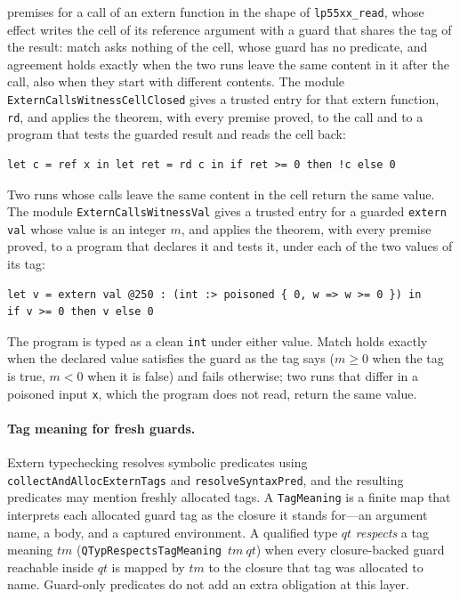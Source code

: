 \documentclass[12pt]{article}
\begin{document}
premises for a call of an extern function in the shape of
\texttt{lp55xx\_read}, whose effect writes the cell of its reference argument
with a guard that shares the tag of the result: match asks nothing of the
cell, whose guard has no predicate, and agreement holds exactly when the two
runs leave the same content in it after the call, also when they start with
different contents.  The module \texttt{ExternCallsWitnessCellClosed} gives a
trusted entry for that extern function, \texttt{rd}, and applies the theorem,
with every premise proved, to the call and to a program that tests the guarded
result and reads the cell back:
\begin{lstlisting}[language=poison]
let c = ref x in let ret = rd c in if ret >= 0 then !c else 0
\end{lstlisting}
Two runs whose calls leave the same content in the cell return the same value.
The module \texttt{ExternCallsWitnessVal} gives a trusted entry for a guarded
\texttt{extern val} whose value is an integer $m$, and applies the theorem,
with every premise proved, to a program that declares it and tests it, under
each of the two values of its tag:
\begin{lstlisting}[language=poison]
let v = extern val @250 : (int :> poisoned { 0, w => w >= 0 }) in
if v >= 0 then v else 0
\end{lstlisting}
The program is typed as a clean \texttt{int} under either value.  Match holds
exactly when the declared value satisfies the guard as the tag says ($m \ge 0$
when the tag is true, $m < 0$ when it is false) and fails otherwise; two runs
that differ in a poisoned input \texttt{x}, which the program does not read,
return the same value.

\paragraph{Tag meaning for fresh guards.}
Extern typechecking resolves symbolic predicates using
\texttt{collectAndAllocExternTags} and \texttt{resolveSyntaxPred}, and the
resulting predicates may mention freshly allocated tags. A \texttt{TagMeaning}
is a finite map that interprets each allocated guard tag as the closure it
stands for---an argument name, a body, and a captured environment. A qualified
type $qt$ \emph{respects} a tag meaning $tm$
(\texttt{QTypRespectsTagMeaning}~$tm~qt$) when every closure-backed guard
reachable inside $qt$ is mapped by $tm$ to the closure that tag was allocated
to name. Guard-only predicates do not add an extra obligation at this layer.
\end{document}
